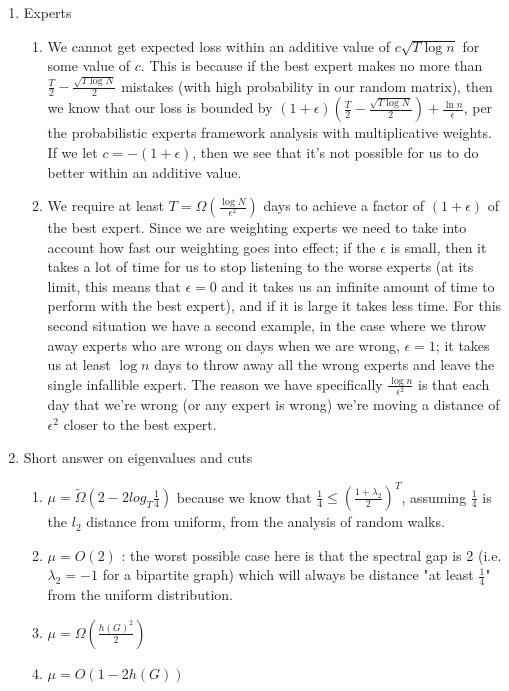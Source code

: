 \documentclass[a4paper]{article}
\begin{document}
\begin{enumerate}
\begin{enumerate}
	\end{enumerate}
\item Experts
	\begin{enumerate}
		\item We cannot get expected loss within an additive value of $c\sqrt{T\log n}$ for some value of $c$.  This is because if the best expert makes no more than $\frac{T}{2} - \frac{\sqrt{T\log N}}{2}$ mistakes (with high probability in our random matrix), then we know that our loss is bounded by $(1+\epsilon)(\frac{T}{2} - \frac{\sqrt{T\log N}}{2}) + \frac{\ln n}{\epsilon}$, per the probabilistic experts framework analysis with multiplicative weights.  If we let $c=-(1+\epsilon)$, then we see that it's not possible for us to do better within an additive value.
		\item We require at least $T = \Omega(\frac{\log N}{\epsilon ^2})$ days to achieve a factor of $(1+ \epsilon)$ of the best expert.   Since we are weighting experts we need to take into account how fast our weighting goes into effect; if the $\epsilon$ is small, then it takes a lot of time for us to stop listening to the worse experts (at its limit, this means that $\epsilon = 0$ and it takes us an infinite amount of time to perform with the best expert), and if it is large it takes less time.  For this second situation we have a second example, in the case where we throw away experts who are wrong on days when we are wrong, $\epsilon = 1$; it takes us at least $\log n$ days to throw away all the wrong experts and leave the single infallible expert.  The reason we have specifically $\frac{\log n}{\epsilon^2}$ is that each day that we're wrong (or any expert is wrong) we're moving a distance of $\epsilon^2$ closer to the best expert.
	\end{enumerate}
\item Short answer on eigenvalues and cuts
	\begin{enumerate}
		\item $\mu = \tilde{\Omega}(2-2log_T \frac{1}{4})$ because we know that $\frac{1}{4} \leq (\frac{1+\lambda_2}{2})^T$, assuming $\frac{1}{4}$ is the $l_2$ distance from uniform, from the analysis of random walks.
		\item $\mu = O(2)$ : the worst possible case here is that the spectral gap is 2 (i.e. $\lambda_2=-1$ for a bipartite graph) which will always be distance "at least $\frac{1}{4}$" from the uniform distribution.
		\item $\mu = \Omega(\frac{h(G)^2}{2})$
		\item $\mu = O(1-2h(G))$

\end{enumerate}
\end{enumerate}
\end{document}
